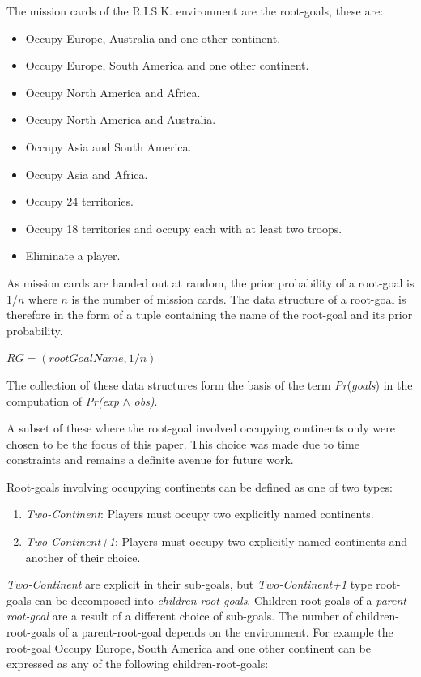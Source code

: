 \documentclass[parskip]{cs4rep}
\begin{document}
The mission cards of the R.I.S.K. environment are the root-goals, these are:

\begin{itemize}
\item
Occupy Europe, Australia and one other continent.
\item
Occupy Europe, South America and one other continent.
\item
Occupy North America and Africa.
\item
Occupy North America and Australia.
\item
Occupy Asia and South America.
\item
Occupy Asia and Africa.
\item
Occupy 24 territories.
\item
Occupy 18 territories and occupy each with at least two troops.
\item
Eliminate a player.
\end{itemize}

As mission cards are handed out at random, the prior probability of a root-goal is 1/$n$ where $n$ is the number of mission cards. The data structure of a root-goal is therefore in the form of a tuple containing the name of the root-goal and its prior probability.

\centerline{
 $RG = ( rootGoalName, 1/n)$\newline
}

The collection of these data structures form the basis of the term \textit{Pr}(\textit{goals}) in the computation of \textit{Pr(exp} $\wedge$ \textit{obs)}.

A subset of these where the root-goal involved occupying continents only were chosen to be the focus of this paper. This choice was made due to time constraints and remains a definite avenue for future work. 

Root-goals involving occupying continents can be defined as one of two types:

\begin{enumerate}
\item
\textit{Two-Continent}: Players must occupy two explicitly named continents.
\item
\textit{Two-Continent+1}: Players must occupy two explicitly named continents and another of their choice.
\end{enumerate}

\textit{Two-Continent} are explicit in their sub-goals, but \textit{Two-Continent+1} type root-goals can be decomposed into \textit{children-root-goals}. Children-root-goals of a \textit{parent-root-goal} are a result of a different choice of sub-goals. The number of children-root-goals of a parent-root-goal depends on the environment. For example the root-goal Occupy Europe, South America and one other continent can be expressed as any of the following children-root-goals:
\end{document}
